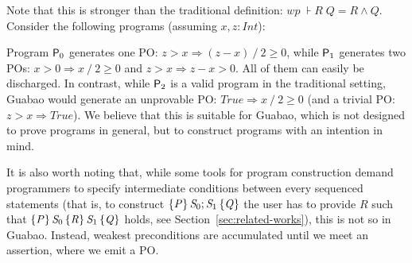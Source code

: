\documentclass[runningheads]{llncs}
\newcommand{\Conid}[1]{\mathit{#1}}
\newcommand{\Varid}[1]{\mathit{#1}}
\renewcommand{\geq}{\geqslant}
\def\resethooks{%
  \global\let\SaveRestoreHook\empty
  \global\let\ColumnHook\empty}
\let\hspre\empty
\let\hspost\empty
\let\Varid\mathit
\let\Conid\mathit
\newcounter{linenum}
\begin{document}
Note that this is stronger than the traditional definition:
\ensuremath{\Varid{wp}\;\assert{\Conid{R}}\;\Conid{Q}\mathrel{=}\Conid{R}\mathrel{\wedge}\Conid{Q}}.
Consider the following programs (assuming \ensuremath{\Varid{x},\Varid{z}\mathbin{:}\Conid{Int}}):
\resethooks
Program ${\sf P}_0$ generates one PO: \ensuremath{\Varid{z}\mathbin{>}\Varid{x}\mathrel{\Rightarrow}(\Varid{z}\mathbin{-}\Varid{x})\mathbin{/}\mathrm{2}\geq \mathrm{0}}, while ${\sf P}_1$ generates two POs: \ensuremath{\Varid{x}\mathbin{>}\mathrm{0}\mathrel{\Rightarrow}\Varid{x}\mathbin{/}\mathrm{2}\geq \mathrm{0}} and \ensuremath{\Varid{z}\mathbin{>}\Varid{x}\mathrel{\Rightarrow}\Varid{z}\mathbin{-}\Varid{x}\mathbin{>}\mathrm{0}}.
All of them can easily be discharged.
In contrast, while ${\sf P}_2$ is a valid program in the traditional setting, Guabao would generate an unprovable PO: \ensuremath{\Conid{True}\mathrel{\Rightarrow}\Varid{x}\mathbin{/}\mathrm{2}\geq \mathrm{0}} (and a trivial PO: \ensuremath{\Varid{z}\mathbin{>}\Varid{x}\mathrel{\Rightarrow}\Conid{True}}).
We believe that this is suitable for Guabao, which is not designed to prove programs in general, but to construct programs with an intention in mind.

It is also worth noting that, while some tools for program construction demand programmers to specify intermediate conditions between every sequenced statements (that is, to construct \ensuremath{\htriple{\Conid{P}}{\Conid{S}_{0};\Conid{S}_{1}}{\Conid{Q}}} the user has to provide \ensuremath{\Conid{R}} such that \ensuremath{\htripletwo{\Conid{P}}{\Conid{S}_{0}}{\Conid{R}}{\Conid{S}_{1}}{\Conid{Q}}} holds, see Section~\ref{sec:related-works}),
this is not so in Guabao. Instead, weakest preconditions are accumulated until we meet an assertion, where we emit a PO.
\end{document}
